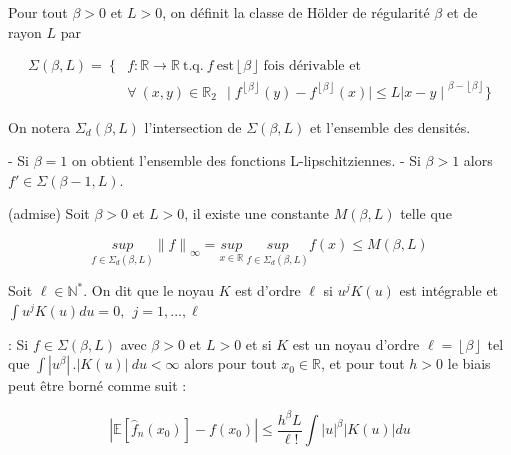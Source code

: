 \documentclass[
]{book}
\begin{document}
\begin{dfn} Pour tout $\beta > 0$ et $L > 0$, on définit la classe de Hölder de régularité $\beta$ et de rayon $L$ par

$$
\begin{aligned}
  \Sigma(\beta,L)= ~\{&f:\mathbb{R} \longrightarrow \mathbb{R}\ \text{t.q.}\ f\ \text{est} \left\lfloor{\beta}\right\rfloor\ \text{fois dérivable et} \\
 & \forall\ (x,y) \in \mathbb{R}_2\ ~ \mid f^{\left\lfloor{\beta}\right\rfloor}(y)-f^{\left\lfloor{\beta}\right\rfloor}(x)\mid \leq L{\mid x-y\mid}^{\beta - \left\lfloor{\beta}\right\rfloor}\}
 \end{aligned}
$$

On notera $\Sigma_d(\beta,L)$ l'intersection de $\Sigma(\beta,L)$ et l'ensemble des densités.

\end{dfn}
\begin{rem}   
 - Si $\beta = 1$ on obtient l'ensemble des fonctions L-lipschitziennes.\newline
 - Si $\beta > 1$ alors $f'\in \Sigma(\beta-1,L)$.
\end{rem}
\begin{prop} (admise) Soit $\beta > 0$ et $L > 0$, il existe une constante $M(\beta, L)$ telle que

$$
\underset{f \in \Sigma_d(\beta,L)}{sup}{\parallel f \parallel}_{\infty}= \underset{x \in \mathbb{R}}{sup}\ \underset{f \in \Sigma_d(\beta,L)}{sup}f(x) \leq M(\beta,L)
$$
\end{prop}

\begin{dfn} Soit $\ell \in \mathbb{N^*}$. On dit que le noyau $K$ est d'ordre $\ell$ si $u^jK(u)$ est intégrable et 
$\int u^jK(u)du =  0,\   \ j = {1,...,\ell}$

\end{dfn}
\begin{prop}: Si $f \in \Sigma(\beta,L)$ avec $\beta > 0$ et $L > 0$ et si $K$ est un noyau d'ordre $\ell = \left\lfloor{\beta}\right\rfloor$ tel que $\int |{u}^{\beta}|\,.|{K(u)}|~du < \infty$ alors pour tout $x_0 \in \mathbb{R}$, et pour tout $h>0$ le biais peut être borné comme suit :

$$
|\mathbb{E}[\hat{f}_n(x_0)] - f(x_0)|\leqslant \frac{h^{\beta}L}{\ell!}\int|u|^{\beta}|K(u)|du
$$
\end{prop}
\end{document}
